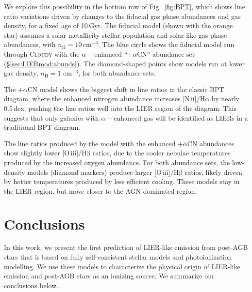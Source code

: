 \documentclass[preprint2]{aastex62}
\newcommand{\Cloudy}{\textsc{Cloudy}\xspace}
\newcommand{\nii}{[N\,{\sc ii}]\xspace}
\newcommand{\oiii}{[O\,{\sc iii}]\xspace}
\newcommand{\ha}{\ensuremath{\mathrm{H\alpha}}\xspace}
\newcommand{\hb}{\ensuremath{\mathrm{H\beta}}\xspace}
\newcommand{\Gyr}{$\,$Gyr\xspace}
\newcommand{\alphaCN}{\ensuremath{+\alpha\mathrm{CN}}\xspace}
\begin{document}
We explore this possibility in the bottom row of Fig.~\ref{fig:BPT}, which shows line ratio variations driven by changes to the fiducial gas phase abundances and gas density, for a fixed age of 10\Gyr. The fiducial model (shown with the orange star) assumes a solar metallicity stellar population and solar-like gas phase abundances, with $n_{\mathrm{H}}=10$\,cm$^{-3}$. The blue circle shows the fiducial model run through \Cloudy with the $\alpha-$enhanced ``\alphaCN'' abundance set (\S\ref{sec:LIERmod:abunds}). The diamond-shaped points show models run at lower gas density, $n_{\mathrm{H}}=1$ cm$^{-3}$, for both abundance sets.

The \alphaCN model shows the biggest shift in line ratios in the classic BPT diagram, where the enhanced nitrogen abundance increases \nii/\ha by nearly 0.5\,dex, pushing the line ratios well into the LIER region of the diagram. This suggests that only galaxies with $\alpha-$enhanced gas will be identified as LIERs in a traditional BPT diagram.

The line ratios produced by the model with the enhanced \alphaCN abundances show slightly lower \oiii/\hb ratios, due to the cooler nebulae temperatures produced by the increased oxygen abundance. For both abundance sets, the low-density models (diamond markers) produce larger \oiii/\hb ratios, likely driven by hotter temperatures produced by less efficient cooling. These models stay in the LIER region, but move closer to the AGN dominated region.



\section{Conclusions}\label{sec:conclusions}

In this work, we present the first prediction of LIER-like emission from post-AGB stars that is based on fully self-consistent stellar models and photoionization modelling. We use these models to characterize the physical origin of LIER-like emission and post-AGB stars as an ionizing source. We summarize our conclusions below.
\end{document}
